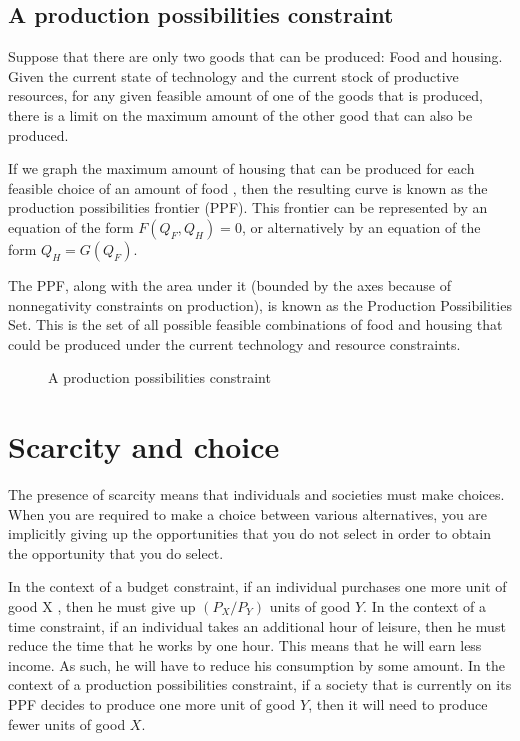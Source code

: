 \documentclass[letterpaper,10pt,english]{jupyterBook}
\begin{document}
\subsection{A production possibilities constraint}
\label{\detokenize{01.intro_to_economics:a-production-possibilities-constraint}}
\sphinxAtStartPar
Suppose that there are only two goods that can be produced: Food and housing. Given the current state of technology and the current stock of productive resources, for any given feasible amount of one of the goods that is produced, there is a limit on the maximum amount of the other good that can also be produced.

\sphinxAtStartPar
If we graph the maximum amount of housing that can be produced for each feasible choice of an amount of food , then the resulting curve is known as the production possibilities frontier (PPF). This frontier can be represented by an equation of the form \(F(Q_F, Q_H) = 0\), or alternatively by an equation of the form \(Q_H = G(Q_F)\).

\sphinxAtStartPar
The PPF, along with the area under it (bounded by the axes because of non\sphinxhyphen{}negativity constraints on production), is known as the Production Possibilities Set. This is the set of all possible feasible combinations of food and housing that could be produced under the current technology and resource constraints.

\begin{figure}[htbp]
\centering
\capstart

\noindent{}
\caption{A production possibilities constraint}\label{\detokenize{01.intro_to_economics:id4}}\end{figure}


\section{Scarcity and choice}
\label{\detokenize{01.intro_to_economics:scarcity-and-choice}}
\sphinxAtStartPar
The presence of scarcity means that individuals and societies must make choices. When you are required to make a choice between various alternatives, you are implicitly giving up the opportunities that you do not select in order to obtain the opportunity that you do select.

\sphinxAtStartPar
In the context of a budget constraint, if an individual purchases one more unit of good X , then he must give up \((P_X / P_Y)\) units of good \(Y\). In the context of a time constraint, if an individual takes an additional hour of leisure, then he must reduce the time that he works by one hour. This means that he will earn less income. As such, he will have to reduce his consumption by some amount. In the context of a production possibilities constraint, if a society that is currently on its PPF decides to produce one more unit of good \(Y\), then it will need to produce fewer units of good \(X\).
\end{document}
